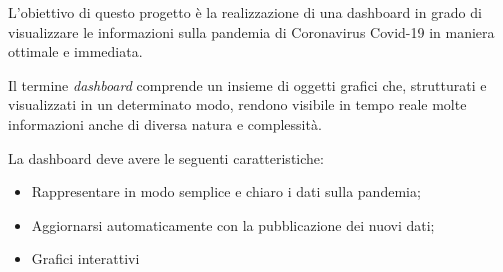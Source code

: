 \setlength{\parskip}{1em}

\noindent L’obiettivo di questo progetto è la realizzazione di una dashboard in grado di visualizzare le informazioni sulla pandemia di Coronavirus Covid-19 in maniera ottimale e immediata.


\noindent Il termine \emph{dashboard} comprende un insieme di oggetti grafici che, strutturati e visualizzati in un determinato modo, rendono visibile in tempo reale molte informazioni anche di diversa natura e complessità. 

\noindent La dashboard deve avere le seguenti caratteristiche:

\begin{itemize}
    \item Rappresentare in modo semplice e chiaro i dati sulla pandemia;
    \item Aggiornarsi automaticamente con la pubblicazione dei nuovi dati;
    \item Grafici interattivi
\end{itemize}
